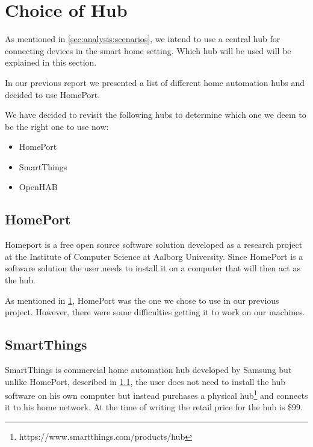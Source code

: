 \section{Choice of Hub}
\label{sec:analysis:choice-of-hub}


As mentioned in \cref{sec:analysis:scenarios}, we intend to use a central hub for connecting devices in the smart home setting. Which hub will be used will be explained in this section.

In our previous report \cite{prespecialisation} we presented a list of different home automation hubs and decided to use HomePort.

We have decided to revisit the following hubs to determine which one we deem to be the right one to use now:

\begin{itemize}
    \item HomePort
    \item SmartThings
    \item OpenHAB
\end{itemize}

\subsection{HomePort}
\label{sec:analysis:choice-of-hub:homeport}

Homeport \cite{HOMEPORT10,homeport:github} is a free open source software solution developed as a research project at the Institute of Computer Science at Aalborg University.
Since HomePort is a software solution the user needs to install it on a computer that will then act as the hub.

As mentioned in \cref{sec:analysis:choice-of-hub}, HomePort was the one we chose to use in our previous project. However, there were some difficulties getting it to work on our machines.

\subsection{SmartThings}
\label{sec:analysis:choice-of-hub:smartthings}

SmartThings \cite{SMARTTHINGS} is commercial home automation hub developed by Samsung but unlike HomePort, described in \cref{sec:analysis:choice-of-hub:homeport}, the user does not need to install the hub software on his own computer but instead purchases a physical hub\footnote{https://www.smartthings.com/products/hub} and connects it to his home network.
At the time of writing the retail price for the hub is \$99.

